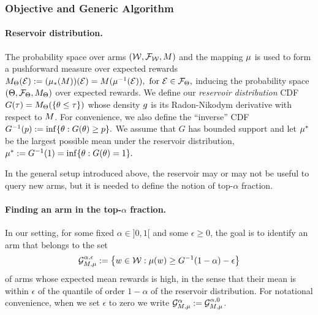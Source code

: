\subsubsection{Objective and Generic Algorithm}\label{generic}

\paragraph{Reservoir distribution.}
The probability space over arms $(\mathcal{W}, \mathcal{F}_{\mathcal{W}}, M)$
and the mapping $\mu$ is used to
form a pushforward measure over expected rewards
$
M_\Theta(\mathcal{E}) := (\mu_*(M))(\mathcal{E})
	= M(\mu^{-1}(\mathcal{E})), \text{ for } \mathcal{E} \in \mathcal{F}_\Theta,
$
inducing the probability space
$(\Theta, \mathcal{F}_\Theta, M_\Theta)$
over expected rewards.
We define our \emph{reservoir distribution} CDF
$
	\ExpRewardCDF(\tau) =
		\ExpRewardMeasure( \Set{\theta \le \tau} )
$
whose density $g$ is its Radon-Nikodym derivative
with respect to $M$.
For convenience, we also define the ``inverse'' CDF
$
\ExpRewardInvCDF(p) := \inf \Set{ \expReward : G(\expReward) \ge p }.
$
%
We assume that $G$ has bounded support and let
$\mu^*$ be the largest possible mean under the reservoir distribution,
$
\ArmMean^* := \ExpRewardInvCDF(1)
	= \inf \Set{\expReward : G(\expReward) = 1 }.\label{eq-mustar}
$

In the general setup introduced above, the reservoir may or may not be 
useful to query new arms, but it is needed to define the notion of top-$\alpha$
fraction.

\paragraph{Finding an arm in the top-$\alpha$ fraction.}
In our setting, for some fixed $\alpha \in ]0,1[$ and some $\epsilon \geq 0$, the goal is to identify an
arm that belongs to the set
\begin{align}\label{eq-good-arms}
\GTargetEps := \Set{
\arm \in \Arms :
\ArmMean(\arm) \ge \ExpRewardInvCDF(1 - \alpha) - \epsilon}
\end{align}
of arms whose expected mean rewards is high, in the sense that their mean is
within $\epsilon$ of
the quantile of order $1-\alpha$ of the reservoir distribution.
For notational convenience, when we set $\epsilon$ to zero we write 
$\mathcal{G}_{M,\mu}^{\alpha} := \mathcal{G}_{M,\mu}^{\alpha,0}$.


